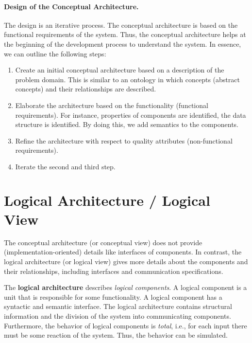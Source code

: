 \documentclass{llncs} %
\begin{document}
\paragraph{Design of the Conceptual Architecture.}
The design is an iterative process. The conceptual architecture is based on the functional requirements of the system.
Thus, the conceptual architecture helps  at the beginning of the development process to
understand the system. In essence, we can outline the following steps:
 \begin{enumerate}
	 \item Create an initial conceptual architecture based on a description of the problem domain.
	         This is similar to an ontology in which concepts (abstract concepts) and their relationships
					      are described.
	 \item Elaborate the architecture based on the functionality (functional requirements).
	       For instance, properties of components are identified, the data structure is identified.
				 By doing this, we add semantics to the components.
	 \item Refine the architecture with respect to quality attributes (non-functional requirements).
	 \item Iterate the second and third step.
 \end{enumerate}


\section{Logical Architecture / Logical View}

The conceptual architecture (or conceptual view) does not provide (implementation-oriented) details
like interfaces of components.
In contrast, the logical architecture (or logical view) gives more details about the components
and their relationships, including interfaces and communication specifications.

The \textbf{logical architecture}  describes \emph{logical components}.
A logical component is a unit that is responsible for some functionality.
A logical component has a syntactic and semantic interface.
The logical architecture contains structural information
and the division of the system into communicating components.
Furthermore, the behavior of logical components is \emph{total},
i.e., for each input there must be some reaction of the system.
Thus, the behavior can be simulated.
\end{document}
